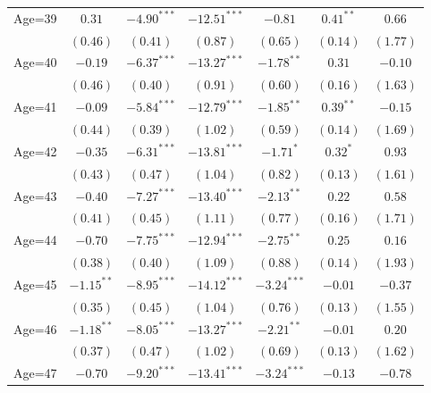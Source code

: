 \documentclass[fullpage]{paper}
\begin{document}
\begin{center}
\begin{longtable}{l c c c c c c }
Age=39      & $0.31$        & $-4.90^{***}$  & $-12.51^{***}$ & $-0.81$        & $0.41^{**}$   & $0.66$        \\
            & $(0.46)$      & $(0.41)$       & $(0.87)$       & $(0.65)$       & $(0.14)$      & $(1.77)$      \\
Age=40      & $-0.19$       & $-6.37^{***}$  & $-13.27^{***}$ & $-1.78^{**}$   & $0.31$        & $-0.10$       \\
            & $(0.46)$      & $(0.40)$       & $(0.91)$       & $(0.60)$       & $(0.16)$      & $(1.63)$      \\
Age=41      & $-0.09$       & $-5.84^{***}$  & $-12.79^{***}$ & $-1.85^{**}$   & $0.39^{**}$   & $-0.15$       \\
            & $(0.44)$      & $(0.39)$       & $(1.02)$       & $(0.59)$       & $(0.14)$      & $(1.69)$      \\
Age=42      & $-0.35$       & $-6.31^{***}$  & $-13.81^{***}$ & $-1.71^{*}$    & $0.32^{*}$    & $0.93$        \\
            & $(0.43)$      & $(0.47)$       & $(1.04)$       & $(0.82)$       & $(0.13)$      & $(1.61)$      \\
Age=43      & $-0.40$       & $-7.27^{***}$  & $-13.40^{***}$ & $-2.13^{**}$   & $0.22$        & $0.58$        \\
            & $(0.41)$      & $(0.45)$       & $(1.11)$       & $(0.77)$       & $(0.16)$      & $(1.71)$      \\
Age=44      & $-0.70$       & $-7.75^{***}$  & $-12.94^{***}$ & $-2.75^{**}$   & $0.25$        & $0.16$        \\
            & $(0.38)$      & $(0.40)$       & $(1.09)$       & $(0.88)$       & $(0.14)$      & $(1.93)$      \\
Age=45      & $-1.15^{**}$  & $-8.95^{***}$  & $-14.12^{***}$ & $-3.24^{***}$  & $-0.01$       & $-0.37$       \\
            & $(0.35)$      & $(0.45)$       & $(1.04)$       & $(0.76)$       & $(0.13)$      & $(1.55)$      \\
Age=46      & $-1.18^{**}$  & $-8.05^{***}$  & $-13.27^{***}$ & $-2.21^{**}$   & $-0.01$       & $0.20$        \\
            & $(0.37)$      & $(0.47)$       & $(1.02)$       & $(0.69)$       & $(0.13)$      & $(1.62)$      \\
Age=47      & $-0.70$       & $-9.20^{***}$  & $-13.41^{***}$ & $-3.24^{***}$  & $-0.13$       & $-0.78$       \\

\end{longtable}
\end{center}
\end{document}
